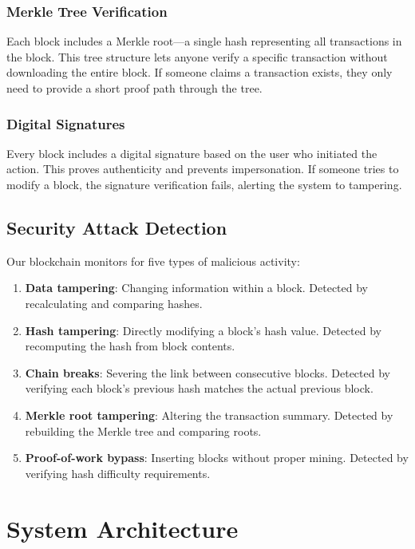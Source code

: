 \documentclass[conference]{IEEEtran}
\begin{document}
\subsubsection{Merkle Tree Verification}
Each block includes a Merkle root—a single hash representing all transactions in the block. This tree structure lets anyone verify a specific transaction without downloading the entire block. If someone claims a transaction exists, they only need to provide a short proof path through the tree.

\subsubsection{Digital Signatures}
Every block includes a digital signature based on the user who initiated the action. This proves authenticity and prevents impersonation. If someone tries to modify a block, the signature verification fails, alerting the system to tampering.

\subsection{Security Attack Detection}

Our blockchain monitors for five types of malicious activity:

\begin{enumerate}
\item \textbf{Data tampering}: Changing information within a block. Detected by recalculating and comparing hashes.
\item \textbf{Hash tampering}: Directly modifying a block's hash value. Detected by recomputing the hash from block contents.
\item \textbf{Chain breaks}: Severing the link between consecutive blocks. Detected by verifying each block's previous hash matches the actual previous block.
\item \textbf{Merkle root tampering}: Altering the transaction summary. Detected by rebuilding the Merkle tree and comparing roots.
\item \textbf{Proof-of-work bypass}: Inserting blocks without proper mining. Detected by verifying hash difficulty requirements.
\end{enumerate}

\section{System Architecture}
\end{document}
